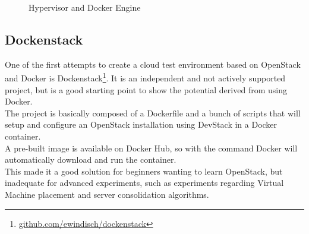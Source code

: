 \begin{figure}[!ht]
\label{fig:docker_vm}
\caption{Hypervisor and Docker Engine}
\end{figure}


\subsection{Dockenstack}
\label{sub:sota_dockenstack}
One of the first attempts to create a cloud test environment based on OpenStack and Docker is Dockenstack\footnote{\url{github.com/ewindisch/dockenstack}}. It is an independent and not actively supported project, but is a good starting point to show the potential derived from using Docker.\\
The project is basically composed of a Dockerfile and a bunch of scripts that will setup and configure an OpenStack installation using DevStack in a Docker container.\\
A pre-built image is available on Docker Hub, so with the command  Docker will automatically download and run the container.\\
This made it a good solution for beginners wanting to learn OpenStack, but inadequate for advanced experiments, such as experiments regarding Virtual Machine placement and server consolidation algorithms.

